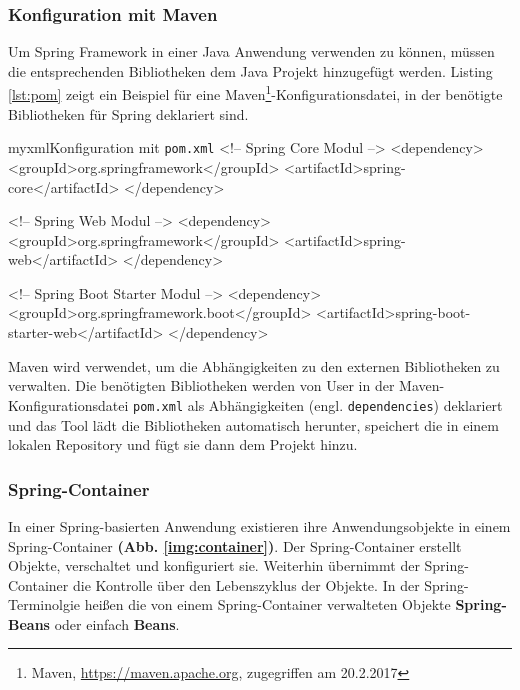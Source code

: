 \subsubsection{Konfiguration mit Maven}
Um Spring Framework in einer Java Anwendung verwenden zu können, müssen die entsprechenden Bibliotheken dem Java Projekt hinzugefügt werden. Listing \ref{lst:pom} zeigt ein Beispiel für eine Maven\footnote{Maven, \url{https://maven.apache.org}, zugegriffen am 20.2.2017}-Konfigurationsdatei, in der benötigte Bibliotheken für Spring deklariert sind.

\begin{listingsboxJava}[label={lst:pom}]{myxml}{Konfiguration mit \texttt{pom.xml}}
	<!-- Spring Core Modul -->
	<dependency>
		<groupId>org.springframework</groupId>
		<artifactId>spring-core</artifactId>
	</dependency>

	<!-- Spring Web Modul -->
	<dependency>
		<groupId>org.springframework</groupId>
		<artifactId>spring-web</artifactId>
	</dependency>
	
	<!-- Spring Boot Starter Modul -->
	<dependency>
		<groupId>org.springframework.boot</groupId>
		<artifactId>spring-boot-starter-web</artifactId>
	</dependency>
\end{listingsboxJava}
Maven wird verwendet, um die Abhängigkeiten zu den externen Bibliotheken zu verwalten. Die benötigten Bibliotheken werden von User in der Maven- Konfigurationsdatei \texttt{pom.xml} als Abhängigkeiten (engl. \texttt{dependencies}) deklariert und das Tool lädt die Bibliotheken automatisch herunter, speichert die in einem lokalen Repository und fügt sie dann dem Projekt hinzu.

\subsubsection{Spring-Container}
In einer Spring-basierten Anwendung existieren ihre Anwendungsobjekte in einem Spring-Container \textbf{(Abb. \ref{img:container})}. Der Spring-Container erstellt Objekte, verschaltet und konfiguriert sie. Weiterhin übernimmt der Spring-Container die Kontrolle über den Lebenszyklus der Objekte. In der Spring-Terminolgie heißen die von einem Spring-Container verwalteten Objekte \textbf{Spring-Beans} oder einfach \textbf{Beans}.

